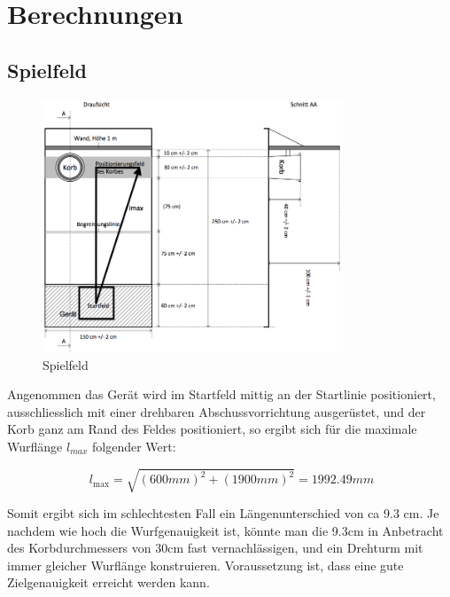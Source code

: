 \section{Berechnungen}

\subsection{Spielfeld}
\begin{figure}[h!]          
    \centering             
    \includegraphics[width=0.8\textwidth]{fig/Bild_Spielfeld.png}    
    \caption{Spielfeld}
    \label{fig:spielfeld}        
\end{figure}
\noindent
Angenommen das Gerät wird im Startfeld mittig an der Startlinie positioniert, 
ausschliesslich mit einer drehbaren Abschussvorrichtung ausgerüstet, und der 
Korb ganz am Rand des Feldes positioniert, so ergibt sich für die maximale 
Wurflänge $l_{max}$ folgender Wert: 

\[\ l_\text{max} = \sqrt{(600mm)^2 + (1900mm)^2} = 1992.49mm \]

Somit ergibt sich im schlechtesten Fall ein Längenunterschied von ca 9.3 cm. 
Je nachdem wie hoch die Wurfgenauigkeit ist, könnte man die 9.3cm in 
Anbetracht des Korbdurchmessers von 30cm fast vernachlässigen, und ein 
Drehturm mit immer gleicher Wurflänge konstruieren. Voraussetzung ist, dass 
eine gute Zielgenauigkeit erreicht werden kann.


